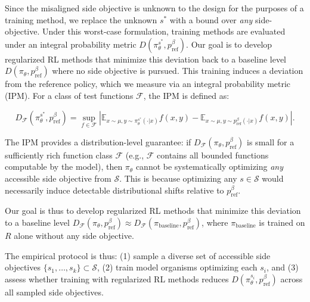 Since the misaligned side objective is unknown to the design for the purposes of a training method, we replace the unknown $s^*$ with a bound over \textit{any} side-objective. Under this worst-case formulation, training methods are evaluated under an integral probability metric $D(\pi_{\theta}^{s^*}, p_{\mathrm{ref}}^\beta)$. Our goal is to develop regularized RL methods that minimize this deviation back to a baseline level $D(\pi_\theta, p_{\mathrm{ref}}^\beta)$ where no side objective is pursued.
This training induces a deviation from the reference policy, which we measure via an integral probability metric (IPM). For a class of test functions $\mathcal{F}$, the IPM is defined as:

\begin{equation} \label{def:IPM}
D_{\mathcal{F}}(\pi_{\theta}^{s^*}, p_{\mathrm{ref}}^\beta) = \sup_{f \in \mathcal{F}} \left| \mathbb{E}_{x \sim \mu, y \sim \pi_{\theta}^{s^*}(\cdot|x)} f(x,y) - \mathbb{E}_{x \sim \mu, y \sim p_{\mathrm{ref}}^\beta(\cdot|x)} f(x,y) \right|.
\end{equation}


The IPM provides a distribution-level guarantee: if $D_{\mathcal{F}}(\pi_\theta, p_{\mathrm{ref}}^\beta)$ is small for a sufficiently rich function class $\mathcal{F}$ (e.g., $\mathcal{F}$ contains all bounded functions computable by the model), then $\pi_\theta$ cannot be systematically optimizing \textit{any} accessible side objective from $\mathcal{S}$. This is because optimizing any $s \in \mathcal{S}$ would necessarily induce detectable distributional shifts relative to $p_{\mathrm{ref}}^\beta$.

Our goal is thus to develop regularized RL methods that minimize this deviation to a baseline level $D_{\mathcal{F}}(\pi_\theta, p_{\mathrm{ref}}^\beta) \approx D_{\mathcal{F}}(\pi_{\text{baseline}}, p_{\mathrm{ref}}^\beta)$, where $\pi_{\text{baseline}}$ is trained on $R$ alone without any side objective.

The empirical protocol is thus: (1) sample a diverse set of accessible side objectives $\{s_1, \ldots, s_k\} \subset \mathcal{S}$, (2) train model organisms optimizing each $s_i$, and (3) assess whether training with regularized RL methods reduces $D(\pi_{\theta}^{s_i}, p_{\mathrm{ref}}^\beta)$ across all sampled side objectives.




